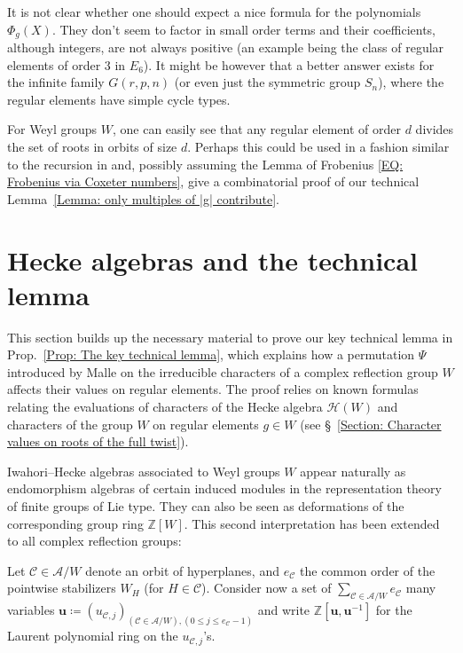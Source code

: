 \documentclass[ALCO, Unicode]{cedram}
\newcommand{\ZZ}{\mathbb{Z}}
\begin{document}
\begin{rema}
It is not clear whether one should expect a nice formula for the polynomials $\Phi_g(X)$. They don't seem to factor in small order terms and their coefficients, although integers, are not always positive (an example being the class of regular elements of order $3$ in $E_6$). It might be however that a better answer exists for the infinite family $G(r,p,n)$ (or even just the symmetric group $S_n$), where the regular elements have simple cycle types.
\end{rema}

\begin{question}
For Weyl groups $W$, one can easily see \cite[Prop.~4.10]{springer-regular-elements} that any regular element of order $d$ divides the set of roots in orbits of size $d$.   Perhaps this could be used in a fashion similar to the recursion in \cite{deligne-letter-to-looijenga,reading-chains-in-noncrossing} and, possibly assuming the Lemma of Frobenius \eqref{EQ: Frobenius via Coxeter numbers}, give a combinatorial proof of our technical Lemma~\ref{Lemma: only multiples of |g| contribute}.
\end{question}


\section{Hecke algebras and the technical lemma}
\label{Section: Hecke algebras and the technical lemma}

This section builds up the necessary material to prove our key technical lemma in Prop.~\ref{Prop: The key technical lemma}, which explains how a permutation $\Psi$ introduced by Malle on the irreducible characters of a complex reflection group $W$ affects their values on regular elements. The proof relies on known formulas relating the evaluations of characters of the Hecke algebra $\mathcal{H}(W)$ and characters of the group $W$ on regular elements $g\in W$ (see \S~\ref{Section: Character values on roots of the full twist}). 

Iwahori--Hecke algebras associated to Weyl groups $W$ appear naturally as endomorphism algebras of certain induced modules in the representation theory of finite groups of Lie type. They can also be seen as deformations of the corresponding group ring $\ZZ[W]$. This second interpretation has been extended to all complex reflection groups:

Let $\mathcal{C}\in\mathcal{A}/W$ denote an orbit of hyperplanes, and $e_{\mathcal{C}}$ the common order of the pointwise stabilizers $W_H$ (for $H\in\mathcal{C}$). Consider now a set of $\sum_{\mathcal{C}\in\mathcal{A}/W}e_{\mathcal{C}}$ many variables $\bm u\coloneqq (u_{\mathcal{C},j})_{(\mathcal{C}\in\mathcal{A}/W),(0\leq j\leq e_{\mathcal{C}}-1)}$ and write $\ZZ[\bm u,\bm u^{-1}]$ for the Laurent polynomial ring on the $u_{\mathcal{C},j}$'s. 
\end{document}
